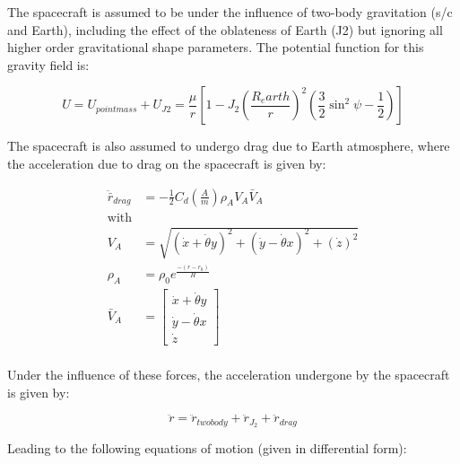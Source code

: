 \documentclass[10pt]{article}
\begin{document}
The spacecraft is assumed to be under the influence of two-body gravitation (s/c and Earth), including the effect of the oblateness of Earth (J2) but ignoring all higher order gravitational shape parameters. The potential function for this gravity field is:

\begin{equation}
 U = U_{pointmass} + U_{J2} =  \frac{\mu}{r}\left[ 1 - J_2\left(\frac{R_earth}{r}\right)^2 (\frac{3}{2}\sin^2{\psi} - \frac{1}{2}) \right]
\end{equation}

The spacecraft is also assumed to undergo drag due to Earth atmosphere, where the acceleration due to drag on the spacecraft is given by:

\begin{equation}
\begin{split}
\ddot{\bar{r}}_{drag} & =  - \frac{1}{2} C_d \left( \frac{A}{m}\right) \rho_A V_A \bar{V}_A\\
\text{with}\\
V_A & = \sqrt{ (\dot{x} +  \dot{\theta}y)^2 + (\dot{y} -  \dot{\theta}x)^2 + (\dot{z})^2 } \\
\rho_A & = \rho_0 e^{\frac{-(r-r_0)}{H}} \\
\bar{V}_A & = 
    \begin{bmatrix} 
     \dot{x} +  \dot{\theta}y \\
     \dot{y} -  \dot{\theta}x\\
     \dot{z}    
     \end{bmatrix} \\
\end{split}
\end{equation}

Under the influence of these forces, the acceleration undergone by the spacecraft is given by:

\begin{equation}
\ddot{r} =  \ddot{r}_{twobody} + \ddot{r}_{J_2} + \ddot{r}_{drag} 
\end{equation}

Leading to the following equations of motion (given in differential form):
\end{document}
